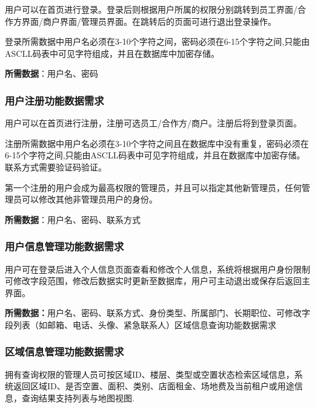 \documentclass[]{article}
\begin{document}
用户可以在首页进行登录。登录后则根据用户所属的权限分别跳转到员工界面/合作方界面/商户界面/管理员界面。在跳转后的页面可进行退出登录操作。

登录所需数据中用户名必须在3-10个字符之间，密码必须在6-15个字符之间,只能由ASCLL码表中可见字符组成，并且在数据库中加密存储。

\textbf{所需数据}：用户名、密码

\hypertarget{ux7528ux6237ux6ce8ux518cux529fux80fdux6570ux636eux9700ux6c42}{%
  \subsubsection{用户注册功能数据需求}\label{ux7528ux6237ux6ce8ux518cux529fux80fdux6570ux636eux9700ux6c42}}

用户可以在首页进行注册，注册可选员工/合作方/商户。注册后将到登录页面。

注册所需数据中用户名必须在3-10个字符之间且在数据库中没有重复，密码必须在6-15个字符之间,只能由ASCLL码表中可见字符组成，并且在数据库中加密存储。联系方式需要验证码验证。

第一个注册的用户会成为最高权限的管理员，并且可以指定其他新管理员，任何管理员可以修改其他非管理员用户的身份。

\textbf{所需数据}：用户名、密码、联系方式

\hypertarget{ux7528ux6237ux4fe1ux606fux7ba1ux7406ux529fux80fdux6570ux636eux9700ux6c42}{%
  \subsubsection{用户信息管理功能数据需求}\label{ux7528ux6237ux4fe1ux606fux7ba1ux7406ux529fux80fdux6570ux636eux9700ux6c42}}

用户可在登录后进入个人信息页面查看和修改个人信息，系统将根据用户身份限制可修改字段范围，修改后数据实时更新至数据库，用户可主动退出或保存后返回主界面。

\textbf{所需数据：}用户名、密码、联系方式、身份类型、所属部门、长期职位、可修改字段列表（如邮箱、电话、头像、紧急联系人）区域信息查询功能数据需求

\hypertarget{ux533aux57dfux4fe1ux606fux7ba1ux7406ux529fux80fdux6570ux636eux9700ux6c42}{%
  \subsubsection{区域信息管理功能数据需求}\label{ux533aux57dfux4fe1ux606fux7ba1ux7406ux529fux80fdux6570ux636eux9700ux6c42}}

拥有查询权限的管理人员可按区域ID、楼层、类型或空置状态检索区域信息，系统返回区域ID、是否空置、面积、类别、店面租金、场地费及当前租户或用途信息，查询结果支持列表与地图视图.
\end{document}
